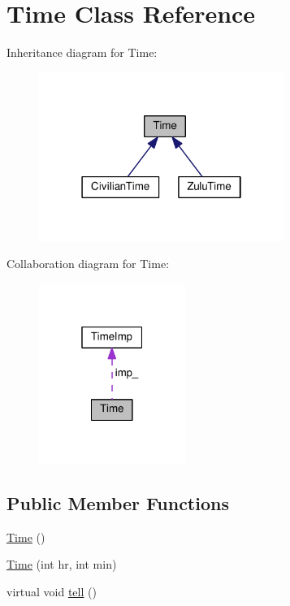 \hypertarget{classTime}{}\section{Time Class Reference}
\label{classTime}


Inheritance diagram for Time\+:
\nopagebreak
\begin{figure}[H]
\begin{center}
\leavevmode
\includegraphics[width=226pt]{classTime__inherit__graph}
\end{center}
\end{figure}


Collaboration diagram for Time\+:
\nopagebreak
\begin{figure}[H]
\begin{center}
\leavevmode
\includegraphics[width=135pt]{classTime__coll__graph}
\end{center}
\end{figure}
\subsection*{Public Member Functions}
\begin{DoxyCompactItemize}
\item 
\hyperlink{classTime_a4245e409c7347d1d671858962c2ca3b5}{Time} ()
\item 
\hyperlink{classTime_a5c41c11dec04077f6827ee6307f8fce5}{Time} (int hr, int min)
\item 
virtual void \hyperlink{classTime_acf77dbaf68fc0ac9cdd238ecf9221c58}{tell} ()
\end{DoxyCompactItemize}

